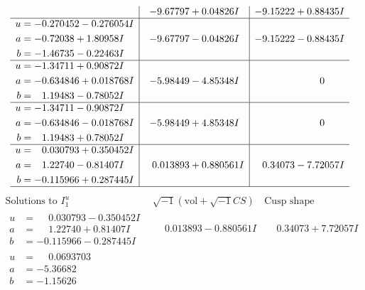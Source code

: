 \documentclass[1p]{elsarticle_modified}
\theoremstyle{definition}
\newcommand{\I}{\sqrt{-1}}
\begin{document}
$$\begin{array}{c|c|c}
 & -9.67797 + 0.04826 I & -9.15222 + 0.88435 I \\ \hline\begin{aligned}
u &= -0.270452 - 0.276054 I \\
a &= -0.72038 + 1.80958 I \\
b &= -1.46735 - 0.22463 I\end{aligned}
 & -9.67797 - 0.04826 I & -9.15222 - 0.88435 I \\ \hline\begin{aligned}
u &= -1.34711 + 0.90872 I \\
a &= -0.634846 + 0.018768 I \\
b &= \phantom{-}1.19483 - 0.78052 I\end{aligned}
 & -5.98449 - 4.85348 I & \phantom{-0.000000 } 0 \\ \hline\begin{aligned}
u &= -1.34711 - 0.90872 I \\
a &= -0.634846 - 0.018768 I \\
b &= \phantom{-}1.19483 + 0.78052 I\end{aligned}
 & -5.98449 + 4.85348 I & \phantom{-0.000000 } 0 \\ \hline\begin{aligned}
u &= \phantom{-}0.030793 + 0.350452 I \\
a &= \phantom{-}1.22740 - 0.81407 I \\
b &= -0.115966 + 0.287445 I\end{aligned}
 & \phantom{-}0.013893 + 0.880561 I & \phantom{-}0.34073 - 7.72057 I\\
 \hline 
 \end{array}$$\newpage$$\begin{array}{c|c|c}  
\text{Solutions to }I^u_{1}& \I (\text{vol} + \sqrt{-1}CS) & \text{Cusp shape}\\
 \hline 
\begin{aligned}
u &= \phantom{-}0.030793 - 0.350452 I \\
a &= \phantom{-}1.22740 + 0.81407 I \\
b &= -0.115966 - 0.287445 I\end{aligned}
 & \phantom{-}0.013893 - 0.880561 I & \phantom{-}0.34073 + 7.72057 I \\ \hline\begin{aligned}
u &= \phantom{-}0.0693703\phantom{ +0.000000I} \\
a &= -5.36682\phantom{ +0.000000I} \\
b &= -1.15626\phantom{ +0.000000I}\end{aligned}

\end{array}$$
\end{document}
